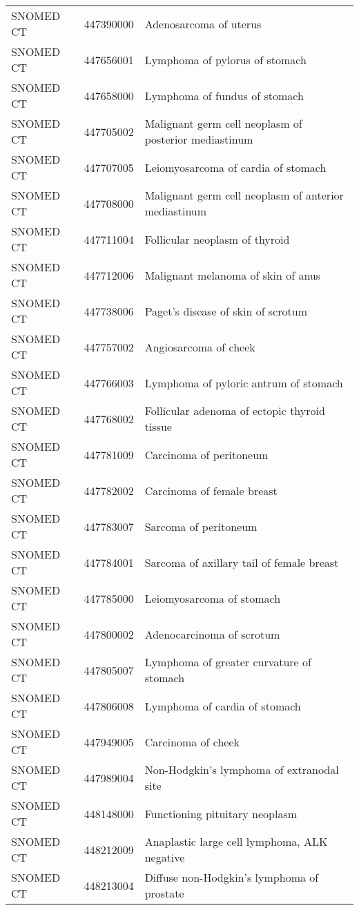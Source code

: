 \begin{longtable}{p{}p{}p{}}
  SNOMED CT & 447390000 & Adenosarcoma of uterus \\ 
  SNOMED CT & 447656001 & Lymphoma of pylorus of stomach \\ 
  SNOMED CT & 447658000 & Lymphoma of fundus of stomach \\ 
  SNOMED CT & 447705002 & Malignant germ cell neoplasm of posterior mediastinum \\ 
  SNOMED CT & 447707005 & Leiomyosarcoma of cardia of stomach \\ 
  SNOMED CT & 447708000 & Malignant germ cell neoplasm of anterior mediastinum \\ 
  SNOMED CT & 447711004 & Follicular neoplasm of thyroid \\ 
  SNOMED CT & 447712006 & Malignant melanoma of skin of anus \\ 
  SNOMED CT & 447738006 & Paget's disease of skin of scrotum \\ 
  SNOMED CT & 447757002 & Angiosarcoma of cheek \\ 
  SNOMED CT & 447766003 & Lymphoma of pyloric antrum of stomach \\ 
  SNOMED CT & 447768002 & Follicular adenoma of ectopic thyroid tissue \\ 
  SNOMED CT & 447781009 & Carcinoma of peritoneum \\ 
  SNOMED CT & 447782002 & Carcinoma of female breast \\ 
  SNOMED CT & 447783007 & Sarcoma of peritoneum \\ 
  SNOMED CT & 447784001 & Sarcoma of axillary tail of female breast \\ 
  SNOMED CT & 447785000 & Leiomyosarcoma of stomach \\ 
  SNOMED CT & 447800002 & Adenocarcinoma of scrotum \\ 
  SNOMED CT & 447805007 & Lymphoma of greater curvature of stomach \\ 
  SNOMED CT & 447806008 & Lymphoma of cardia of stomach \\ 
  SNOMED CT & 447949005 & Carcinoma of cheek \\ 
  SNOMED CT & 447989004 & Non-Hodgkin's lymphoma of extranodal site \\ 
  SNOMED CT & 448148000 & Functioning pituitary neoplasm \\ 
  SNOMED CT & 448212009 & Anaplastic large cell lymphoma, ALK negative \\ 
  SNOMED CT & 448213004 & Diffuse non-Hodgkin's lymphoma of prostate \\ 

\end{longtable}
